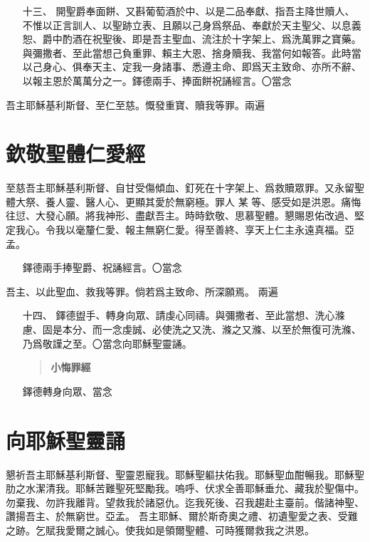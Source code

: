 \begin{enumerate}
    \item[十三、]{\small 開聖爵奉面餅、又斟葡萄酒於中、以是二品奉獻、指吾主降世贖人、不惟以正言訓人、以聖跡立表、且願以己身爲祭品、奉獻於天主聖父、以息義恕、爵中酌酒在祝聖後、即是吾主聖血、流注於十字架上、爲洗萬罪之寶藥。與彌撒者、至此當想己負重罪、賴主大恩、捨身贖我、我當何如報答。此時當以己身心、俱奉天主、定我一身諸事、悉遵主命、即爲天主致命、亦所不辭、以報主恩於萬萬分之一。鐸德兩手、捧面餅祝誦經言。〇當念}
\end{enumerate} 
吾主耶穌基利斯督、至仁至慈。慨發重寶、贖我等罪。{\small 兩遍}
\section*{欽敬聖體仁愛經}
至慈吾主耶穌基利斯督、自甘受傷傾血、釘死在十字架上、爲救贖眾罪。又永留聖體大祭、養人靈、醫人心、更顯其愛於無窮極。罪人 某 等、感受如是洪恩。痛悔往愆、大發心願。將我神形、盡獻吾主。時時欽敬、思慕聖體。懇賜恩佑改過、堅定我心。令我以毫釐仁愛、報主無窮仁愛。得至善終、享天上仁主永遠真福。{\cspace}亞孟。

\begin{enumerate}
    \item[]{\small 鐸德兩手捧聖爵、祝誦經言。〇當念}
\end{enumerate} 
吾主、以此聖血、救我等罪。倘若爲主致命、所深願焉。 {\small 兩遍}

\begin{enumerate}
    \item[十四、]{\small 鐸德盥手、轉身向眾、請虔心同禱。與彌撒者、至此當想、洗心滌慮、固是本分、而一念虔誠、必使洗之又洗、滌之又滌、以至於無復可洗滌、乃爲敬謹之至。〇當念向耶穌聖靈誦。}
    \begin{quote}\bfseries 小悔罪經\end{quote}

\end{enumerate} 
\begin{enumerate}
    \item[]{\small 鐸德轉身向眾、當念}
\end{enumerate} 

\section*{向耶穌聖靈誦}
懇祈吾主耶穌基利斯督、聖靈恩寵我。耶穌聖軀扶佑我。耶穌聖血酣暢我。耶穌聖肋之水潔清我。耶穌苦難聖死堅勵我。嗚呼、伏求全善耶穌垂允、藏我於聖傷中。勿棄我、勿許我離背。望救我於諸惡仇。迄我死後、召我趨赴主臺前。偕諸神聖、讚揚吾主、於無窮世。{\cspace}亞孟。
吾主耶穌、爾於斯奇奧之禮、初遺聖愛之表、受難之跡。乞賦我愛爾之誠心。使我如是領爾聖體、可時獲爾救我之洪恩。

